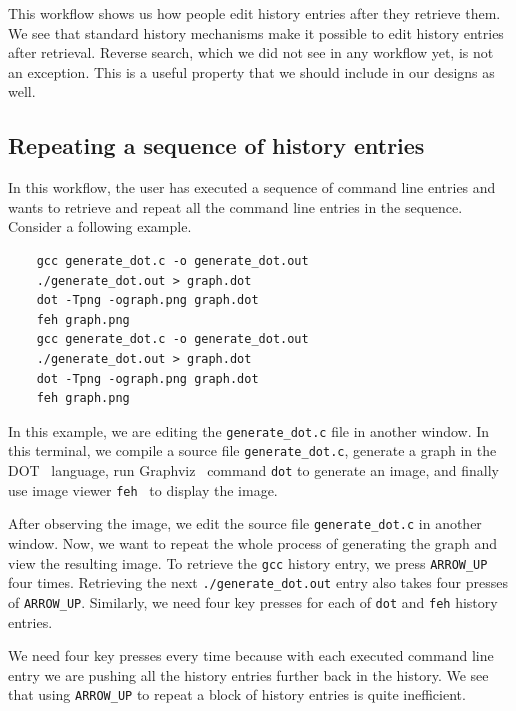 \documentclass[thesis=M,english]{FITthesis}[2012/10/20]
\let\myCite\cite
\renewcommand\cite{\unskip~\myCite}
\begin{document}
This workflow shows us how people edit history entries after they retrieve them. We see that standard history mechanisms make it possible to edit history entries after retrieval. Reverse search, which we did not see in any workflow yet, is not an exception. This is a useful property that we should include in our designs as well. 

\subsection{Repeating a sequence of history entries}\label{workflow-repeating-a-sequence}

In this workflow, the user has executed a sequence of command line entries and wants to retrieve and repeat all the command line entries in the sequence. 
Consider a following example.

\begin{verbatim}
    gcc generate_dot.c -o generate_dot.out
    ./generate_dot.out > graph.dot
    dot -Tpng -ograph.png graph.dot
    feh graph.png
    gcc generate_dot.c -o generate_dot.out
    ./generate_dot.out > graph.dot
    dot -Tpng -ograph.png graph.dot
    feh graph.png
\end{verbatim}

In this example, we are editing the \verb|generate_dot.c| file in another window. In this terminal, we compile a source file \verb|generate_dot.c|, generate a graph in the DOT\cite{graphvizthedotlanguage} language, run Graphviz\cite{ellson2001graphviz} command \verb|dot| to generate an image, and finally use image viewer \verb|feh|\cite{toolsfeh} to display the image.

After observing the image, we edit the source file \verb|generate_dot.c| in another window.
Now, we want to repeat the whole process of generating the graph and view the resulting image. To retrieve the \verb|gcc| history entry, we press \verb|ARROW_UP| four times. Retrieving the next \verb|./generate_dot.out| entry also takes four presses of \verb|ARROW_UP|. Similarly, we need four key presses for each of \verb|dot| and \verb|feh| history entries. 

We need four key presses every time because with each executed command line entry we are pushing all the history entries further back in the history. We see that using \verb|ARROW_UP| to repeat a block of history entries is quite inefficient.  
\end{document}
